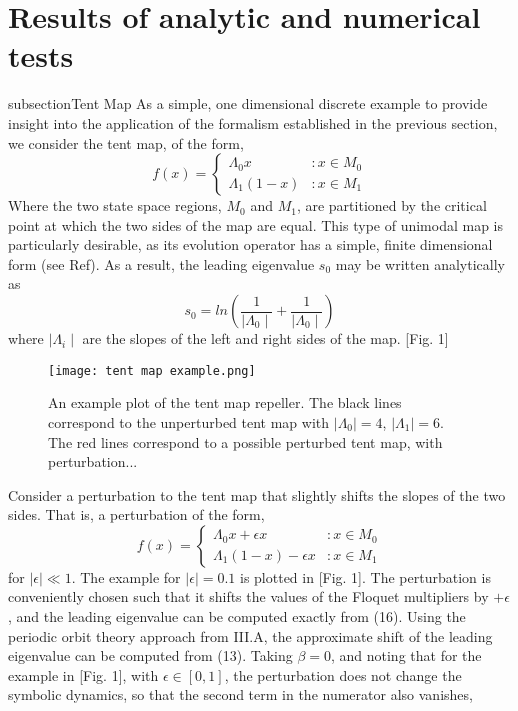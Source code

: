 \documentclass[pre,aps,twocolumn,showpacs,hyperref]{revtex4-1} %
\begin{document}
\section{Results of analytic and numerical tests}
subsection{Tent Map}
As a simple, one dimensional discrete example to provide insight into the application of the formalism established in the previous section, we consider the tent map, of the form,
\begin{equation}
f(x) = \left\{
     \begin{array}{lr}
       \Lambda_{0} x & : x \in M_{0}\\
       \Lambda_{1} (1-x) & : x \in M_{1}
     \end{array}
   \right.
\end{equation}
Where the two state space regions, $M_{0}$ and $M_{1}$, are partitioned by the critical point at which the two sides of the map are equal. This type of unimodal map is particularly desirable, as its evolution operator has a simple, finite dimensional form (see Ref). As a result, the leading eigenvalue $s_{0}$ may be written analytically as
\begin{equation}
s_{0} = ln\left( \frac{1}{\mid \Lambda_{0}\mid}+\frac{1}{\mid \Lambda_{0}\mid}\right)
\end{equation}
where $\mid \Lambda_{i} \mid$ are the slopes of the left and right sides of the map. [Fig. 1]


\begin{figure}[t]
\begin{centering}
\texttt{[image: tent map example.png]}

\caption{An example plot of the tent map repeller. The black lines correspond to the unperturbed tent map with $\mid \Lambda_{0}\mid=4$, $\mid \Lambda_{1}\mid=6$. The red lines correspond to a possible perturbed tent map, with perturbation...}

\end{centering}
\end{figure}

\indent Consider a perturbation to the tent map that slightly shifts the slopes of the two sides. That is, a perturbation of the form,
\begin{equation}
f(x) = \left\{
     \begin{array}{lr}
       \Lambda_{0} x+\epsilon x & : x \in M_{0}\\
       \Lambda_{1} (1-x)-\epsilon x & : x \in M_{1}
     \end{array}
   \right.
\end{equation}
for $\mid \epsilon \mid \ll 1$. The example for $\mid \epsilon \mid = 0.1$ is plotted in [Fig. 1]. The perturbation is conveniently chosen such that it shifts the values of the Floquet multipliers by $+\epsilon$, and the leading eigenvalue can be computed exactly from (16). Using the periodic orbit theory approach from III.A, the approximate shift of the leading eigenvalue can be computed from (13). Taking $\beta=0$, and noting that for the example in [Fig. 1], with $\epsilon\in [0,1]$, the perturbation does not change the symbolic dynamics, so that the second term in the numerator also vanishes,
\end{document}
